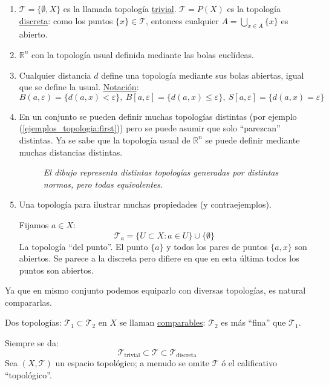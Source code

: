 \begin{ej}
\begin{enumerate}
    \item \label{ejemplos_topologia:first} $\mathcal{T} = \{\emptyset, X\}$ es la llamada topología \underline{trivial}. $\mathcal{T} = P\left( X \right)$ es la topología \underline{discreta}: como los puntos $\{x\} \in \mathcal{T}$, entonces cualquier $A = \bigcup_{x \in A} \{x\}$ es abierto.
    \item $\mathbb{R}^n$ con la topología usual definida mediante las bolas euclídeas.
    \item Cualquier distancia $d$ define una topología mediante sus bolas abiertas, igual que se define la usual. \underline{Notación}: 
    \[
    B\left( a, \varepsilon \right) = \{d\left( a, x \right) < \varepsilon\},\ B\left[ a, \varepsilon \right] = \{d\left( a, x \right) \le \varepsilon \},\ S\left[ a, \varepsilon \right] = \{d\left( a, x \right) = \varepsilon\} 
    \]
    \item En un conjunto se pueden definir muchas topologías distintas (por ejemplo (\ref{ejemplos_topologia:first})) pero se puede asumir que solo ``parezcan'' distintas. Ya se sabe que la topología usual de $\mathbb{R}^n$ se puede definir mediante muchas distancias distintas.

    \begin{figure}[H]
        \centering
        \caption{\textit{El dibujo representa distintas topologías generadas por distintas normas, pero todas equivalentes.}}
        \label{fig:normas-topología}
    \end{figure}

    \item Una topología para ilustrar muchas propiedades (y contraejemplos). 

    Fijamos $a \in X$:
    \[
    \mathcal{T}_a = \{U \subset X: a \in U\} \cup \{\emptyset\} 
    \]
    La topología ``del punto''. El punto $\{a\}$ y todos los pares de puntos $\{a, x\}$ son abiertos. Se parece a la discreta pero difiere en que en esta última todos los puntos son abiertos.
\end{enumerate}
\end{ej}

Ya que en mismo conjunto podemos equiparlo con diversas topologías, es natural compararlas.
\begin{defi}
Dos topologías: $\mathcal{T}_1 \subset \mathcal{T}_2$ en $X$ se llaman \underline{comparables}: $\mathcal{T}_2$ es más ``fina'' que $\mathcal{T}_1$.
\end{defi}
Siempre se da:
\[
\mathcal{T}_{\text{trivial}} \subset \mathcal{T} \subset \mathcal{T}_{\text{discreta}} 
\]
Sea $\left( X, \mathcal{T} \right)$ un espacio topológico; a menudo se omite $\mathcal{T}$ ó el calificativo ``topológico''. 

